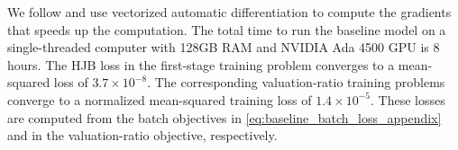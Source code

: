 We follow \cite{Gopalakrishna2026} and use vectorized automatic differentiation to compute the gradients that speeds up the computation.
The total time to run the baseline model on a single-threaded computer with 128GB RAM and NVIDIA Ada 4500 GPU is 8 hours.
The HJB loss in the first-stage training problem converges to a mean-squared loss of $3.7 \times 10^{-8}$.
The corresponding valuation-ratio training problems converge to a normalized mean-squared training loss of $1.4 \times 10^{-5}$.
These losses are computed from the batch objectives in \eqref{eq:baseline_batch_loss_appendix} and in the valuation-ratio objective, respectively.
